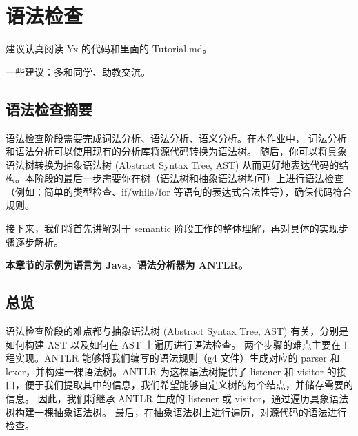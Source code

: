 \chapter{语法检查}

\begin{introduction}
    \item 建议认真阅读 Yx\cite{Yx} 的代码和里面的 Tutorial.md。
    \item 一些建议：多和同学、助教交流。
\end{introduction}


\section{语法检查摘要}
语法检查阶段需要完成词法分析、语法分析、语义分析。在本作业中，
词法分析和语法分析可以使用现有的分析库将源代码转换为语法树。
随后，你可以将具象语法树转换为抽象语法树 (Abstract Syntax Tree, AST)
从而更好地表达代码的结构。本阶段的最后一步需要你在树（语法树和抽象语法树均可）上进行语法检查
（例如：简单的类型检查、if/while/for 等语句的表达式合法性等），确保代码符合规则。

接下来，我们将首先讲解对于 semantic 阶段工作的整体理解，再对具体的实现步骤逐步解析。

\begin{remark}
    \textbf{本章节的示例为语言为 Java，语法分析器为 ANTLR。}
\end{remark}

\section{总览}
语法检查阶段的难点都与抽象语法树 (Abstract Syntax Tree, AST)
有关，分别是如何构建 AST 以及如何在 AST 上遍历进行语法检查。
两个步骤的难点主要在工程实现。ANTLR 能够将我们编写的语法规则（g4 文件）生成对应的
parser 和 lexer，并构建一棵语法树。ANTLR 为这棵语法树提供了 listener 和 visitor
的接口，便于我们提取其中的信息，我们希望能够自定义树的每个结点，并储存需要的信息。
因此，我们将继承 ANTLR 生成的 listener 或 visitor，通过遍历具象语法树构建一棵抽象语法树。
最后，在抽象语法树上进行遍历，对源代码的语法进行检查。

